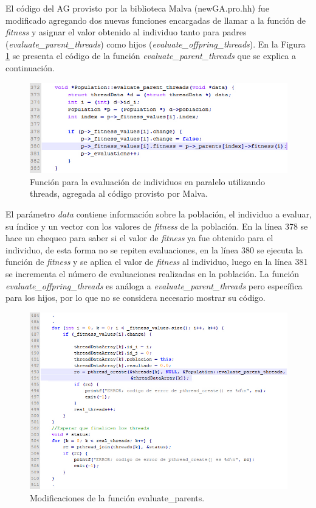 El código del AG provisto por la biblioteca Malva (newGA.pro.hh) fue modificado agregando dos nuevas funciones encargadas de llamar a la función de \emph{fitness} y asignar el valor obtenido al individuo tanto para padres (\emph{evaluate{\_}parent{\_}threads}) como hijos (\emph{evaluate{\_}offpring{\_}threads}). En la Figura \ref{fig:codigo1} se presenta el código de la función \emph{evaluate{\_}parent{\_}threads} que se explica a continuación. 

\begin{figure}[H]
	\centering
	\includegraphics[width=0.99\linewidth]{Figures/codigo1}
	\caption{Función para la evaluación de individuos en paralelo utilizando threads, agregada al código provisto por Malva.}
	\label{fig:codigo1}
\end{figure}

El parámetro \emph{data} contiene información sobre la población, el individuo a evaluar, su índice y un vector con los valores de \emph{fitness} de la población.
En la línea 378 se hace un chequeo para saber si el valor de \emph{fitness} ya fue obtenido para el individuo, de esta forma no se repiten evaluaciones, en la línea 380 se ejecuta la función de \emph{fitness} y se aplica el valor de \emph{fitness} al individuo, luego en la línea 381 se incrementa el número de evaluaciones realizadas en la población.
La función \emph{evaluate{\_}offpring{\_}threads} es análoga a \emph{evaluate{\_}parent{\_}threads} pero específica para los hijos, por lo que no se considera necesario mostrar su código.
	
\begin{figure}[H]
	\centering
	\includegraphics[width=1\linewidth]{Figures/codigo2}
	\caption{Modificaciones de la función evaluate{\_}parents.}
	\label{fig:codigo2}
\end{figure}

